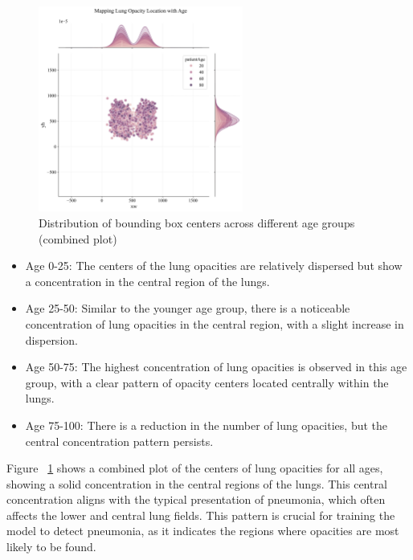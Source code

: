 \begin{figure}[H]
    \begin{center}
        \includegraphics[width = 0.6\textwidth]{figures/Figure15.png}
        \caption{Distribution of bounding box centers across different age groups (combined plot)}
        \label{fig:cha-2 figure10}
    \end{center}
\end{figure}

\begin{itemize}
    \item Age 0-25: The centers of the lung opacities are relatively dispersed but show a concentration in the central region of the lungs.
    \item Age 25-50: Similar to the younger age group, there is a noticeable concentration of lung opacities in the central region, with a slight increase in dispersion.
    \item Age 50-75: The highest concentration of lung opacities is observed in this age group, with a clear pattern of opacity centers located centrally within the lungs.
    \item Age 75-100: There is a reduction in the number of lung opacities, but the central concentration pattern persists.
\end{itemize}

Figure ~\ref{fig:cha-2 figure10} shows a combined plot of the centers of lung opacities for all ages, showing a solid concentration in the central regions of the lungs. This central concentration aligns with the typical presentation of pneumonia, which often affects the lower and central lung fields. This pattern is crucial for training the model to detect pneumonia, as it indicates the regions where opacities are most likely to be found.

